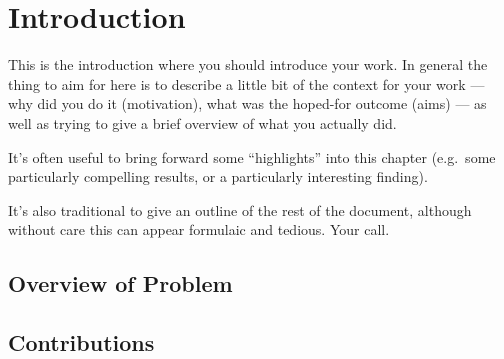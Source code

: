 \chapter{Introduction}


\begin{guidance}
    This is the introduction where you should introduce your work.  In
    general the thing to aim for here is to describe a little bit of the
    context for your work --- why did you do it (motivation), what was the
    hoped-for outcome (aims) --- as well as trying to give a brief
    overview of what you actually did.

    It's often useful to bring forward some ``highlights'' into
    this chapter (e.g.\ some particularly compelling results, or
    a particularly interesting finding).

    It's also traditional to give an outline of the rest of the
    document, although without care this can appear formulaic
    and tedious. Your call.
\end{guidance}

\section{Overview of Problem}

\section{Contributions}
